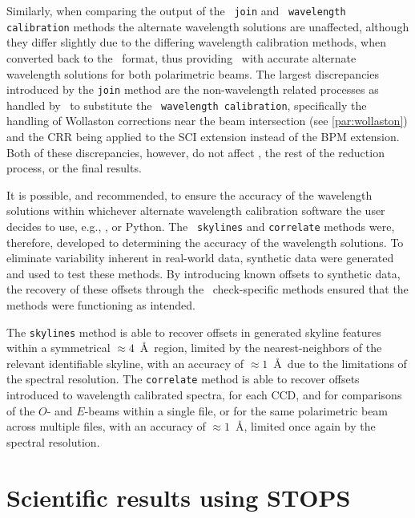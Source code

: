 Similarly, when comparing the output of the \stops\ \texttt{join} and \polsalt\ \texttt{wavelength calibration} methods the alternate wavelength solutions are unaffected, although they differ slightly due to the differing wavelength calibration methods, when converted back to the \polsalt\ format, thus providing \polsalt\ with accurate alternate wavelength solutions for both polarimetric beams.
The largest discrepancies introduced by the \texttt{join} method are the non-wavelength related processes as handled by \stops\ to substitute the \polsalt\ \texttt{wavelength calibration}, specifically the handling of Wollaston corrections near the beam intersection (see \autoref{par:wollaston}) and the \gls{CRR} being applied to the \gls{SCI} extension instead of the \gls{BPM} extension.
Both of these discrepancies, however, do not affect \polsalt, the rest of the reduction process, or the final results.

It is possible, and recommended, to ensure the accuracy of the wavelength solutions within whichever alternate wavelength calibration software the user decides to use, e.g., \iraf, or Python. The \stops\ \texttt{skylines} and \texttt{correlate} methods were, therefore, developed to determining the accuracy of the wavelength solutions.
To eliminate variability inherent in real-world data, synthetic data were generated and used to test these methods.
By introducing known offsets to synthetic data, the recovery of these offsets through the \stops\ check-specific methods ensured that the methods were functioning as intended.

The \texttt{skylines} method is able to recover offsets in generated skyline features within a symmetrical $\approx4$~\AA\ region, limited by the nearest-neighbors of the relevant identifiable skyline, with an accuracy of $\approx1$~\AA\ due to the limitations of the spectral resolution.
The \texttt{correlate} method is able to recover offsets introduced to wavelength calibrated spectra, for each \gls{CCD}, and for comparisons of the $O$- and $E$-beams within a single file, or for the same polarimetric beam across multiple files, with an accuracy of $\approx1$~\AA, limited once again by the spectral resolution.

\section{Scientific results using STOPS} \label{sec:findings}

